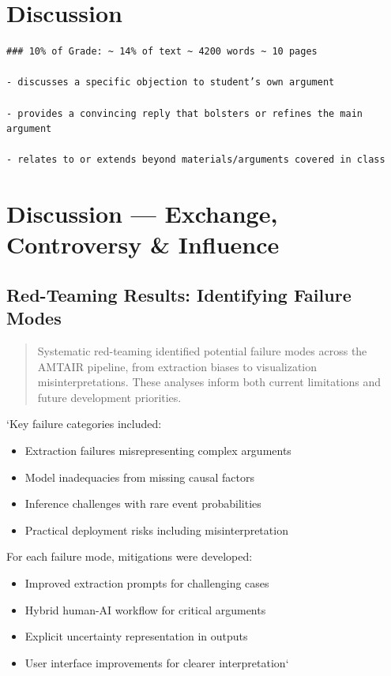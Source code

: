 \documentclass[12pt,a4paper]{report}
\providecommand{\tightlist}{%
  \setlength{\itemsep}{0pt}\setlength{\parskip}{0pt}}
\begin{document}

\chapter{Discussion}\label{discussion}

\begin{verbatim}
### 10% of Grade: ~ 14% of text ~ 4200 words ~ 10 pages

- discusses a specific objection to student’s own argument

- provides a convincing reply that bolsters or refines the main argument

- relates to or extends beyond materials/arguments covered in class
\end{verbatim}


\chapter{Discussion --- Exchange, Controversy \&
Influence}\label{sec-discussion}

\section{Red-Teaming Results: Identifying Failure
Modes}\label{sec-red-teaming}

\begin{quote}
Systematic red-teaming identified potential failure modes across the
AMTAIR pipeline, from extraction biases to visualization
misinterpretations. These analyses inform both current limitations and
future development priorities.
\end{quote}

`Key failure categories included:

\begin{itemize}
\tightlist
\item
  Extraction failures misrepresenting complex arguments
\item
  Model inadequacies from missing causal factors
\item
  Inference challenges with rare event probabilities
\item
  Practical deployment risks including misinterpretation
\end{itemize}

For each failure mode, mitigations were developed:

\begin{itemize}
\tightlist
\item
  Improved extraction prompts for challenging cases
\item
  Hybrid human-AI workflow for critical arguments
\item
  Explicit uncertainty representation in outputs
\item
  User interface improvements for clearer interpretation`
\end{itemize}
\end{document}
